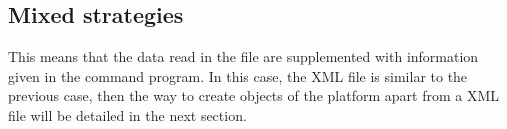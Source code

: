 

\subsection{Mixed strategies}
This means that the data read in the file are supplemented with information given in the command
program.
In this case, the XML file is similar to the previous case, then the way to create objects of
the platform apart from a XML file will be detailed in the next section.

